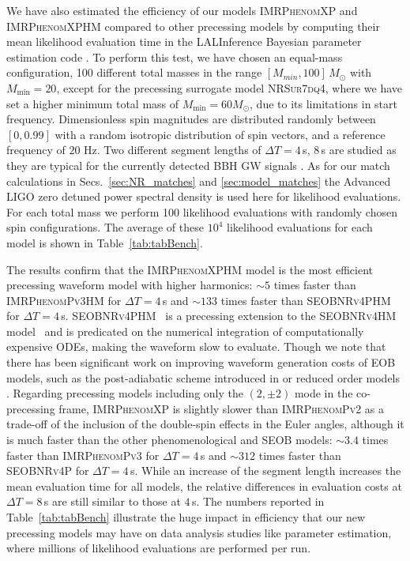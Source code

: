 \documentclass[%
aps,
prd,
amssymb,
amsmath,
amsfonts,
eqsecnum,
showpacs,
nofootinbib,
floatfix,
twocolumn,
twoside,
a4paper,
superscriptaddress
]{revtex4-1}
\newcommand{\ppvtwo}{\textsc{IMRPhenomPv2}\xspace}
\newcommand{\phPvthree}{\textsc{IMRPhenomPv3}\xspace}
\newcommand{\phPvthreehm}{\textsc{IMRPhenomPv3HM}\xspace}
\newcommand{\phXP}{\textsc{IMRPhenomXP}\xspace}
\newcommand{\phXPHM}{\textsc{IMRPhenomXPHM}\xspace}
\newcommand{\NRSur}{\textsc{NRSur7dq4}\xspace}
\newcommand{\seobnrvforhm}{\textsc{SEOBNRv4HM}\xspace}
\newcommand{\seobnrvforphm}{\textsc{SEOBNRv4PHM}\xspace}
\newcommand{\seobnrvforp}{\textsc{SEOBNRv4P}\xspace}
\begin{document}
We have also estimated the efficiency of our models  \phXP and \phXPHM compared to other precessing models by computing their mean likelihood evaluation time in the LALInference Bayesian parameter estimation code \cite{Veitch:2014wba}.
To perform this test, we have chosen an equal-mass configuration, 100 different total masses in the range $[M_{min},100] \, M_\odot$ with  $M_{\min}=20$, except for the precessing surrogate model \NRSur, where we have set a higher minimum total mass of $M_{\min}= 60 M_\odot$, due to its limitations in start frequency.
Dimensionless spin magnitudes are distributed randomly between $[0,0.99]$ with a random isotropic distribution of spin vectors, and a reference frequency of $20$ Hz. 
Two different segment lengths of $\Delta T= 4$\,s, 8\,s are studied as they are typical for the currently detected BBH GW signals \cite{LIGOScientific:2018mvr}. As for our match calculations in Secs.~\ref{sec:NR_matches} and \ref{sec:model_matches} the Advanced LIGO zero detuned power spectral density \cite{adligopsd} is used here for likelihood evaluations.
For each total mass we perform 100 likelihood evaluations with randomly chosen spin configurations. The average of these $10^4$ likelihood evaluations for each model is shown in Table~\ref{tab:tabBench}.

The results confirm that the \phXPHM model is the most efficient precessing waveform model with higher harmonics: $\sim 5$ times faster than \phPvthreehm \cite{Khan:2019kot} for $\Delta T= 4$\,s and $\sim 133 $ times faster than \seobnrvforphm  for $\Delta T= 4$\,s. \seobnrvforphm~\cite{SEOBNRv4PHM:inprep} is a precessing extension to the \seobnrvforhm model~\cite{Cotesta:2018fcv} and is predicated on the numerical integration of computationally expensive ODEs, making the waveform slow to evaluate. Though we note that there has been significant work on improving waveform generation costs of EOB models, such as the post-adiabatic scheme introduced in \cite{Nagar:2018gnk} or reduced order models \cite{Purrer:2015tud}. Regarding precessing models including only the $(2,\pm 2)$ mode in the co-precessing frame, \phXP is slightly slower than \ppvtwo %
as a trade-off of the inclusion of the double-spin effects in the Euler angles, although it is much faster than the other phenomenological and SEOB models: $\sim 3.4 $ times faster than \phPvthree %
for $\Delta T= 4$\,s and $\sim 312 $ times faster than \seobnrvforp for $\Delta T= 4$\,s.
While an increase of the segment length increases the mean evaluation time for all models, the relative differences in evaluation costs at  $\Delta T= 8$\,s are still similar to those at $4$\,s.
The numbers reported  in Table~\ref{tab:tabBench} illustrate the huge impact in efficiency that our new precessing models may have on data analysis studies like parameter estimation, where millions of likelihood evaluations are performed per run.
\end{document}
